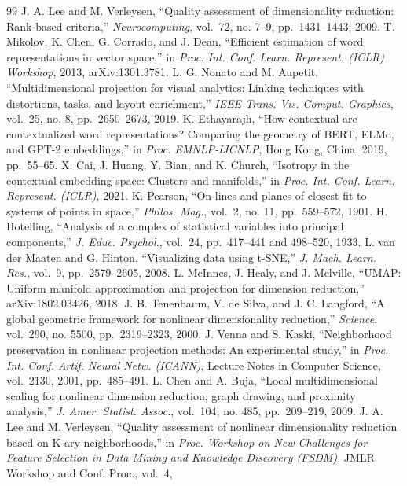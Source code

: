\documentclass[conference,a4paper]{IEEEtran}
\begin{document}
\begin{thebibliography}{99}
 J. A. Lee and M. Verleysen, ``Quality assessment of dimensionality
reduction: Rank-based criteria,'' \emph{Neurocomputing}, vol.~72, no.
7--9, pp.~1431--1443, 2009.
 T. Mikolov, K. Chen, G. Corrado, and J. Dean, ``Efficient estimation of
word representations in vector space,'' in \emph{Proc. Int. Conf. Learn.
Represent. (ICLR) Workshop}, 2013, arXiv:1301.3781.
 L. G. Nonato and M. Aupetit, ``Multidimensional projection for visual
analytics: Linking techniques with distortions, tasks, and layout
enrichment,'' \emph{IEEE Trans. Vis. Comput. Graphics}, vol.~25, no. 8,
pp.~2650--2673, 2019.
 K. Ethayarajh, ``How contextual are contextualized word representations?
Comparing the geometry of BERT, ELMo, and GPT-2 embeddings,'' in
\emph{Proc. EMNLP-IJCNLP}, Hong Kong, China, 2019, pp.~55--65.
 X. Cai, J. Huang, Y. Bian, and K. Church, ``Isotropy in the contextual
embedding space: Clusters and manifolds,'' in \emph{Proc. Int. Conf.
Learn. Represent. (ICLR)}, 2021.
 K. Pearson, ``On lines and planes of closest fit to systems of points in
space,'' \emph{Philos. Mag.}, vol.~2, no. 11, pp.~559--572, 1901.
 H. Hotelling, ``Analysis of a complex of statistical variables into
principal components,'' \emph{J. Educ. Psychol.}, vol.~24, pp.~417--441
and 498--520, 1933.
 L. van der Maaten and G. Hinton, ``Visualizing data using t-SNE,''
\emph{J. Mach. Learn. Res.}, vol.~9, pp.~2579--2605, 2008.
 L. McInnes, J. Healy, and J. Melville, ``UMAP: Uniform manifold
approximation and projection for dimension reduction,''
arXiv:1802.03426, 2018.
 J. B. Tenenbaum, V. de Silva, and J. C. Langford, ``A global geometric
framework for nonlinear dimensionality reduction,'' \emph{Science},
vol.~290, no. 5500, pp.~2319--2323, 2000.
 J. Venna and S. Kaski, ``Neighborhood preservation in nonlinear
projection methods: An experimental study,'' in \emph{Proc. Int. Conf.
Artif. Neural Netw. (ICANN)}, Lecture Notes in Computer Science,
vol.~2130, 2001, pp.~485--491.
 L. Chen and A. Buja, ``Local multidimensional scaling for nonlinear
dimension reduction, graph drawing, and proximity analysis,'' \emph{J.
Amer. Statist. Assoc.}, vol.~104, no. 485, pp.~209--219, 2009.
 J. A. Lee and M. Verleysen, ``Quality assessment of nonlinear
dimensionality reduction based on K-ary neighborhoods,'' in \emph{Proc.
Workshop on New Challenges for Feature Selection in Data Mining and
Knowledge Discovery (FSDM)}, JMLR Workshop and Conf. Proc., vol.~4,

\end{thebibliography}
\end{document}
